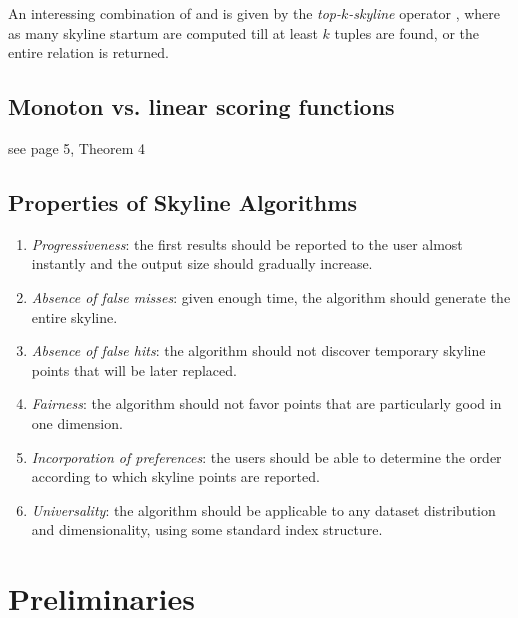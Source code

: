 An interessing combination of  and  is given by the \emph{top-$k$-skyline} operator , where as many skyline startum are computed till at least $k$ tuples are found, or the entire relation is returned.


\subsection{Monoton vs. linear scoring functions}\label{subsec:scoring}
see \citep{Chomicki2002a} page 5, Theorem 4

\subsection{Properties of Skyline Algorithms}


\begin{enumerate}
\item \emph{Progressiveness}: the first results should be reported to the user almost instantly and the output size should gradually increase.

\item \emph{Absence of false misses}: given enough time, the algorithm should generate the entire skyline.

\item \emph{Absence of false hits}: the algorithm should not discover temporary skyline points that will be later replaced.

\item \emph{Fairness}: the algorithm should not favor points that are particularly good in one dimension.

\item \emph{Incorporation of preferences}: the users should be able to determine the order according to which skyline points are reported.

\item \emph{Universality}: the algorithm should be applicable to any dataset distribution and dimensionality, using some standard index structure.
\end{enumerate}


\section{Preliminaries}
